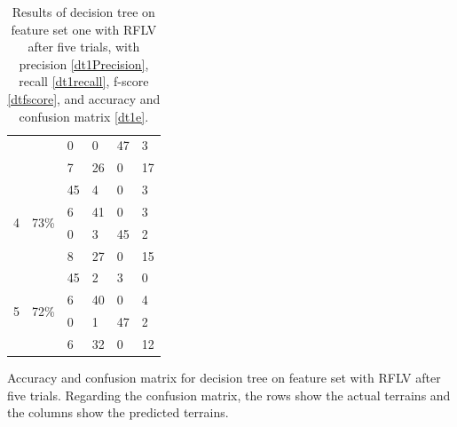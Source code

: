 \documentclass[USenglish]{ifimaster}  %
\begin{document}
\begin{table}[h]
\begin{subtable}[h]{1\textwidth}
\begin{tabular}{@{}llllll@{}}
			\multicolumn{1}{l|}{} & \multicolumn{1}{l|}{} & \multicolumn{1}{l|}{0} & \multicolumn{1}{l|}{0} & \multicolumn{1}{l|}{47} & 3 \\ \cmidrule(l){3-6} 
			\multicolumn{1}{l|}{} & \multicolumn{1}{l|}{} & \multicolumn{1}{l|}{7} & \multicolumn{1}{l|}{26} & \multicolumn{1}{l|}{0} & 17 \\ \midrule
			\multicolumn{1}{l|}{\multirow{4}{*}{4}} & \multicolumn{1}{l|}{\multirow{4}{*}{73\%}} & \multicolumn{1}{l|}{45} & \multicolumn{1}{l|}{4} & \multicolumn{1}{l|}{0} & 3 \\ \cmidrule(l){3-6} 
			\multicolumn{1}{l|}{} & \multicolumn{1}{l|}{} & \multicolumn{1}{l|}{6} & \multicolumn{1}{l|}{41} & \multicolumn{1}{l|}{0} & 3 \\ \cmidrule(l){3-6} 
			\multicolumn{1}{l|}{} & \multicolumn{1}{l|}{} & \multicolumn{1}{l|}{0} & \multicolumn{1}{l|}{3} & \multicolumn{1}{l|}{45} & 2 \\ \cmidrule(l){3-6} 
			\multicolumn{1}{l|}{} & \multicolumn{1}{l|}{} & \multicolumn{1}{l|}{8} & \multicolumn{1}{l|}{27} & \multicolumn{1}{l|}{0} & 15 \\ \midrule
			\multicolumn{1}{l|}{\multirow{4}{*}{5}} & \multicolumn{1}{l|}{\multirow{4}{*}{72\%}} & \multicolumn{1}{l|}{45} & \multicolumn{1}{l|}{2} & \multicolumn{1}{l|}{3} & 0 \\ \cmidrule(l){3-6} 
			\multicolumn{1}{l|}{} & \multicolumn{1}{l|}{} & \multicolumn{1}{l|}{6} & \multicolumn{1}{l|}{40} & \multicolumn{1}{l|}{0} & 4 \\ \cmidrule(l){3-6} 
			\multicolumn{1}{l|}{} & \multicolumn{1}{l|}{} & \multicolumn{1}{l|}{0} & \multicolumn{1}{l|}{1} & \multicolumn{1}{l|}{47} & 2 \\ \cmidrule(l){3-6} 
			\multicolumn{1}{l|}{} & \multicolumn{1}{l|}{} & \multicolumn{1}{l|}{6} & \multicolumn{1}{l|}{32} & \multicolumn{1}{l|}{0} & 12 \\ \bottomrule
		\end{tabular}
		\caption{Accuracy and confusion matrix for decision tree on feature set with RFLV after five trials. Regarding the confusion matrix, the rows show the actual terrains and the columns show the predicted terrains.}
		\label{dt4}
		\end{subtable}
	\caption[Results of SVM on feature set three with RFE]{Results of decision tree on feature set one with RFLV after five trials, with precision \ref{dt1Precision}, recall \ref{dt1recall}, f-score \ref{dtfscore}, and accuracy and confusion matrix \ref{dt1e}.}
\label{tab:binary3}
\end{table}
\FloatBarrier
\newpage
\end{document}
